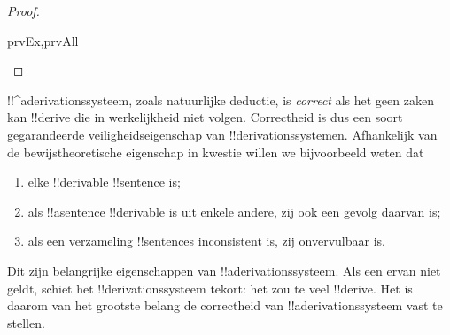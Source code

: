 \documentclass[openany]{memoir}
\begin{document}
\begin{proof}
\begin{tagenumerate}{prvEx,prvAll}

\end{tagenumerate}
\end{proof}
\endgroup

\begingroup
\def\olfilename{OLP-0095}
\def\olfilepath{content/first-order-logic/natural-deduction/}
\hypertarget{unit-OLP-0095}{}



      {}
      {}
      

\begin{explain}
!!^a{derivation}ssysteem, zoals natuurlijke deductie, is
\emph{correct} als het geen zaken kan !!{derive} die in werkelijkheid
niet volgen. Correctheid is dus een soort gegarandeerde
veiligheidseigenschap van !!{derivation}ssystemen. Afhankelijk van de
bewijstheoretische eigenschap in kwestie willen we bijvoorbeeld weten
dat
\begin{enumerate}
\item elke !!{derivable} !!{sentence}  is;
\item als !!a{sentence} !!{derivable} is uit enkele andere, zij ook een
  gevolg daarvan is;
\item als een verzameling !!{sentence}s inconsistent is, zij
  onvervulbaar is.
\end{enumerate}
Dit zijn belangrijke eigenschappen van !!a{derivation}ssysteem. Als
een ervan niet geldt, schiet het !!{derivation}ssysteem tekort: het zou
te veel !!{derive}. Het is daarom van het grootste belang de
correctheid van !!a{derivation}ssysteem vast te stellen.
\end{explain}
\end{document}
